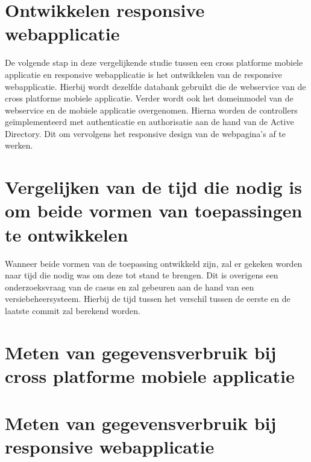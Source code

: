 \section{Ontwikkelen responsive webapplicatie}
De volgende stap in deze vergelijkende studie tussen een cross platforme mobiele applicatie en responsive webapplicatie is het
ontwikkelen van de responsive webapplicatie. Hierbij wordt dezelfde databank gebruikt die de webservice van de cross platforme
mobiele applicatie. Verder wordt ook het domeinmodel van de webservice en de mobiele applicatie overgenomen. Hierna worden de controllers
geïmplementeerd met authenticatie en authorisatie aan de hand van de Active Directory. Dit om vervolgens het responsive design van de webpagina's af te werken.

\section{Vergelijken van de tijd die nodig is om beide vormen van toepassingen te ontwikkelen}
Wanneer beide vormen van de toepassing ontwikkeld zijn, zal er gekeken worden naar tijd die nodig was om deze tot stand te brengen.
Dit is overigens een onderzoeksvraag van de casus en zal gebeuren aan de hand van een versiebeheersysteem.
Hierbij de tijd tussen het verschil tussen de eerste en de laatste 
commit zal berekend worden.

\section{Meten van gegevensverbruik bij cross platforme mobiele applicatie}

\section{Meten van gegevensverbruik bij responsive webapplicatie}
